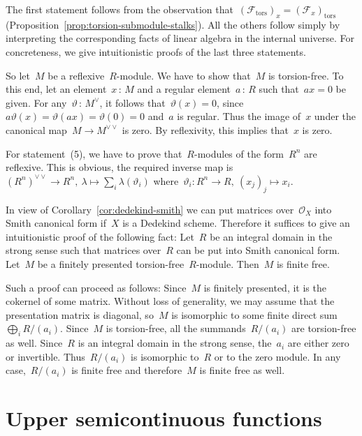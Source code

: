\documentclass[10pt,reqno,a4paper]{amsbook}
\makeatletter
\theoremstyle{definition}
\theoremstyle{plain}
\theoremstyle{remark}
\newcommand{\F}{\mathcal{F}}
\renewcommand{\O}{\mathcal{O}}
\newcommand{\tors}{\mathrm{tors}}
\newcommand{\?}{\,{:}\,}
\renewcommand{\_}{\mathpunct{.}\,}
\renewenvironment{proof}[1][\proofname]{\par
  \pushQED{\qed}%
  \normalfont \topsep6\p@\@plus6\p@\relax
  \trivlist
  \item[\hskip\labelsep
        \itshape
    #1\@addpunct{.}]\ignorespaces
}{%
  \popQED\endtrivlist\@endpefalse
}
\makeatother
\begin{document}
\begin{proof}The first statement follows from the observation that~$(\F_\tors)_x
= (\F_x)_\tors$ (Proposition~\ref{prop:torsion-submodule-stalks}). All the
others follow simply by interpreting the corresponding facts of linear algebra
in the internal universe. For concreteness, we give intuitionistic proofs of
the last three statements.

So let~$M$ be a reflexive~$R$-module. We have to show that~$M$ is
torsion-free. To this end, let an element~$x \? M$ and a regular element~$a \?
R$ such that~$ax = 0$ be given. For any~$\vartheta \? M^\vee$, it follows
that~$\vartheta(x) = 0$, since~$a \vartheta(x) = \vartheta(ax) = \vartheta(0) =
0$ and~$a$ is regular. Thus the image of~$x$ under the canonical map~$M \to
M^{\vee\vee}$ is zero. By reflexivity, this implies that~$x$ is zero.

For statement~(5), we have to prove that~$R$-modules of the form~$R^n$ are
reflexive. This is obvious, the required inverse map is~$(R^n)^{\vee\vee} \to
R^n,\ \lambda \mapsto \sum_i \lambda(\vartheta_i)$ where~$\vartheta_i : R^n \to
R,\ (x_j)_j \mapsto x_i$.

In view of Corollary~\ref{cor:dedekind-smith} we can put matrices over~$\O_X$
into Smith canonical form if~$X$ is a Dedekind scheme. Therefore it suffices
to give an intuitionistic proof of the following fact: Let~$R$ be an integral
domain in the strong sense such that matrices over~$R$ can be put into
Smith canonical form. Let~$M$ be a finitely presented torsion-free~$R$-module.
Then~$M$ is finite free.

Such a proof can proceed as follows: Since~$M$ is finitely presented, it is the cokernel of
some matrix. Without loss of generality, we may assume that the presentation matrix is diagonal,
so~$M$ is isomorphic to some finite direct sum~$\bigoplus_i R/(a_i)$.
Since~$M$ is torsion-free, all the summands~$R/(a_i)$ are torsion-free as well.
Since~$R$ is an integral domain in the strong sense,
the~$a_i$ are either zero or invertible. Thus~$R/(a_i)$ is isomorphic to~$R$ or
to the zero module. In any case,~$R/(a_i)$ is finite free and therefore~$M$
is finite free as well.
\end{proof}


\section{Upper semicontinuous functions}
\label{sect:upper-semicontinuous-functions}
\end{document}

